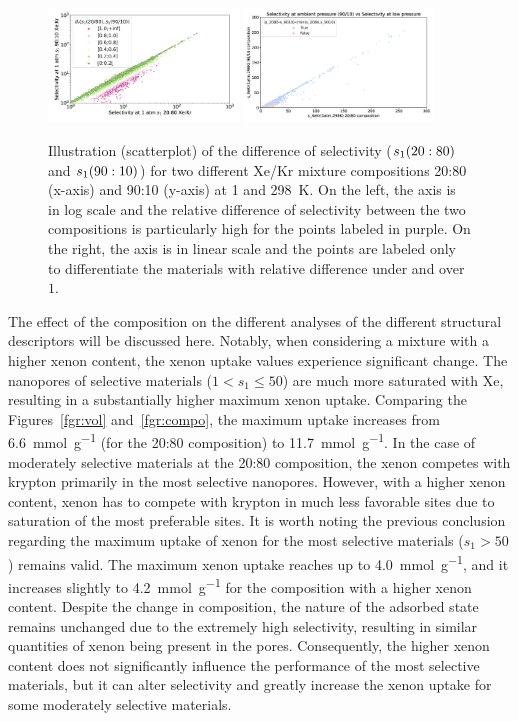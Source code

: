 \documentclass[main.tex]{subfiles}
\begin{document}
\begin{figure}[ht]
  \centering
    \includegraphics[width=0.45\textwidth]{figures/2-thermo/s_2080_vs_s_9010_overview_log.jpg}
    \includegraphics[width=0.45\textwidth]{figures/2-thermo/s_2080_vs_s_9010_overview.jpg}
    \caption{Illustration (scatterplot) of the difference of selectivity ($s_{\text{1}}(20:80)$ and $s_{\text{1}}(90:10)$) for two different Xe/Kr mixture compositions 20:80 (x-axis) and 90:10 (y-axis) at \SI{1}{\atm} and \SI{298}{\kelvin}. On the left, the axis is in log scale and the relative difference of selectivity between the two compositions is particularly high for the points labeled in purple. On the right, the axis is in linear scale and the points are labeled only to differentiate the materials with relative difference under and over $1$.}\label{fgr:SI:overview_2080_9010}
  \end{figure}

The effect of the composition on the different analyses of the different structural descriptors will be discussed here. Notably, when considering a mixture with a higher xenon content, the xenon uptake values experience significant change. The nanopores of selective materials ($1<s_1\leq 50$) are much more saturated with Xe, resulting in a substantially higher maximum xenon uptake. Comparing the Figures~\ref{fgr:vol} and~\ref{fgr:compo}, the maximum uptake increases from \SI{6.6}{\milli\mole\per\gram} (for the 20:80 composition) to \SI{11.7}{\milli\mole\per\gram}. In the case of moderately selective materials at the 20:80 composition, the xenon competes with krypton primarily in the most selective nanopores. However, with a higher xenon content, xenon has to compete with krypton in much less favorable sites due to saturation of the most preferable sites. It is worth noting the previous conclusion regarding the maximum uptake of xenon for the most selective materials ($s_1>50$) remains valid. The maximum xenon uptake reaches up to \SI{4.0}{\milli\mole\per\gram}, and it increases slightly to \SI{4.2}{\milli\mole\per\gram} for the composition with a higher xenon content. Despite the change in composition, the nature of the adsorbed state remains unchanged due to the extremely high selectivity, resulting in similar quantities of xenon being present in the pores. Consequently, the higher xenon content does not significantly influence the performance of the most selective materials, but it can alter selectivity and greatly increase the xenon uptake for some moderately selective materials.
\end{document}
